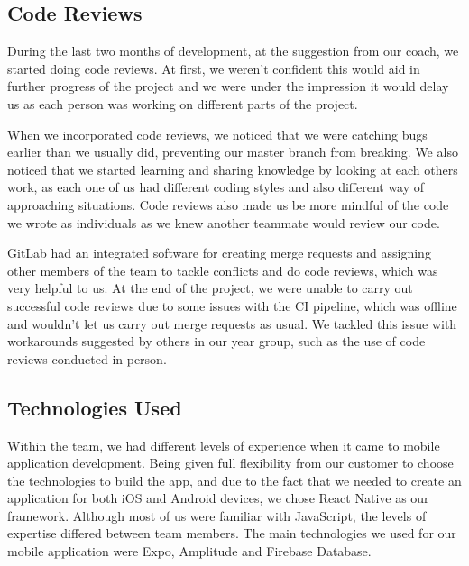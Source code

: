\documentclass{l3proj}
\begin{document}
\subsection{Code Reviews}
\label{subsec: code reviews}
During the last two months of development, at the suggestion from our coach, we started doing code reviews. At first, we weren't confident this would aid in further progress of the project and we were under the impression it would delay us as each person was working on different parts of the project. \par
When we incorporated code reviews, we noticed that we were catching bugs earlier than we usually did, preventing our master branch from breaking. We also noticed that we started learning and sharing knowledge by looking at each others work, as each one of us had different coding styles and also different way of approaching situations. Code reviews also made us be more mindful of the code we wrote as individuals as we knew another teammate would review our code. \par
GitLab had an integrated software for creating merge requests and assigning other members of the team to tackle conflicts and do code reviews, which was very helpful to us. At the end of the project, we were unable to carry out successful code reviews due to some issues with the CI pipeline, which was offline and wouldn't let us carry out merge requests as usual. We tackled this issue with workarounds suggested by others in our year group, such as the use of code reviews conducted in-person. \par
\subsection{Technologies Used}
\label{subsec:technologies used}
Within the team, we had different levels of experience when it came to mobile application development. Being given full flexibility from our customer to choose the technologies to build the app, and due to the fact that we needed to create an application for both iOS and Android devices, we chose React Native as our framework. Although most of us were familiar with JavaScript, the levels of expertise differed between team members. The main technologies we used for our mobile application were Expo, Amplitude and Firebase Database.\par
\end{document}
